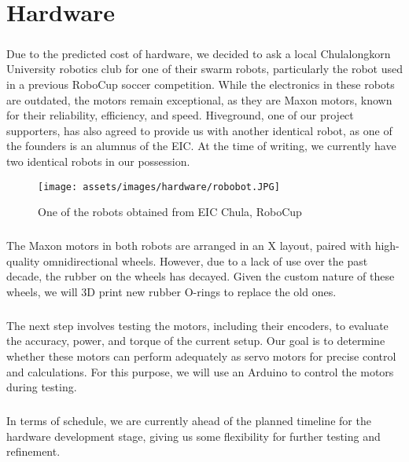 \chapter{Hardware}

\paragraph*{}
Due to the predicted cost of hardware, we decided to ask a local Chulalongkorn University robotics club for one of their swarm robots, particularly the robot used in a previous RoboCup soccer competition. While the electronics in these robots are outdated, the motors remain exceptional, as they are Maxon motors, known for their reliability, efficiency, and speed. Hiveground, one of our project supporters, has also agreed to provide us with another identical robot, as one of the founders is an alumnus of the EIC. At the time of writing, we currently have two identical robots in our possession.
\begin{figure}[H]
    \centering
    \texttt{[image: assets/images/hardware/robobot.JPG]}
    \caption{One of the robots obtained from EIC Chula, RoboCup}
    \label{fig:robobot}
\end{figure}
\paragraph*{}
The Maxon motors in both robots are arranged in an X layout, paired with high-quality omnidirectional wheels. However, due to a lack of use over the past decade, the rubber on the wheels has decayed. Given the custom nature of these wheels, we will 3D print new rubber O-rings to replace the old ones.
\paragraph*{}
The next step involves testing the motors, including their encoders, to evaluate the accuracy, power, and torque of the current setup. Our goal is to determine whether these motors can perform adequately as servo motors for precise control and calculations. For this purpose, we will use an Arduino to control the motors during testing.
\paragraph*{}
In terms of schedule, we are currently ahead of the planned timeline for the hardware development stage, giving us some flexibility for further testing and refinement.